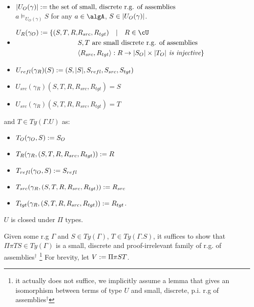 \documentclass[12pt,a4paper]{article}
\def\src{_{src}}\alwaysmath{src}
\def\rfl{_{refl}}\alwaysmath{rfl}
\def\tgt{_{tgt}}\alwaysmath{tgt}
\renewcommand{\O}{_{O}}
\newcommand{\R}{\ensuremath{_{R}}}
\begin{document}
\begin{itemize}
  \item $\carr{U\O(\gamma)} \define \text{the set of small, discrete r.g. of assemblies}$ \\
   $a \vDash_{U\O(\gamma)} S$ for any $a \in \algA$, $S \in \carr{U\O(\gamma)}$. 
   
  \item $\begin{aligned}
  U\R(\gamma\O) \define \{(S,T, R, & R\src, R\tgt) \quad|\quad R \in \cU \\
  & S,T \text{ are small discrete r.g. of assemblies} \\
  & \langle R\src, R\tgt\rangle : R \to \carr{S\O} \times \carr{T\O} \textit { is injective} \}
  \end{aligned}$
  
  \item $U\rfl(\gamma\R)(S) \define (S, \carr{S}, S\rfl, S\src, S\tgt)$
  
  \item $U\src(\gamma\R)(S, T, R, R\src, R\tgt) = S$
  
  \item $U\src(\gamma\R)(S, T, R, R\src, R\tgt) = T$
\end{itemize}
and $T \in Ty(\Gamma . U)$ as:
\begin{itemize}
  \item $T\O(\gamma\O, S) \define S\O$
  \item $T\R(\gamma\R, (S,T, R, R\src, R\tgt)) \define R$
  \item $T\rfl(\gamma\O, S) \define S\rfl$
  \item $T\src(\gamma\R, (S,T, R, R\src, R\tgt)) \define R\src$
  \item $T\tgt(\gamma\R, (S,T, R, R\src, R\tgt)) \define R\tgt$.
\end{itemize}
\begin{claim} $U$ is closed under $\Pi$ types.
\end{claim}
Given some r.g $\Gamma$ and $S \in Ty(\Gamma)$, $T \in Ty(\Gamma.S)$, it suffices to show that $\Pi \pi T S \in Ty(\Gamma)$ is a small, discrete and proof-irrelevant family of r.g. of assemblies$^\dagger$ \footnote{it actually does not suffice, we implicitly assume a lemma that gives an isomorphism between terms of type $U$ and small, discrete, p.i. r.g of assemblies$^\dagger$} For brevity, let $V := \Pi \pi S T$.\\
\end{document}
